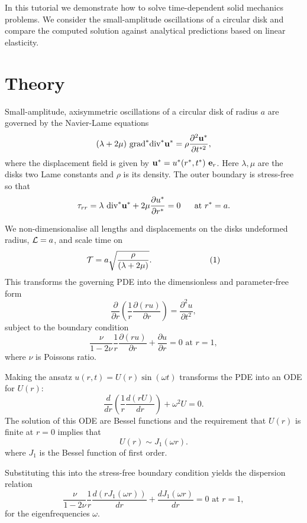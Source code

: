 In this tutorial we demonstrate how to solve time-\/dependent solid mechanics problems. We consider the small-\/amplitude oscillations of a circular disk and compare the computed solution against analytical predictions based on linear elasticity.



 

\hypertarget{index_theory}{}\section{Theory}\label{index_theory}
Small-\/amplitude, axisymmetric oscillations of a circular disk of radius $ a $ are governed by the Navier-\/\+Lame equations \[ (\lambda +2 \mu) \ \mbox{grad}^* \mbox{div}^* {\bf u}^* = \rho \frac{\partial^2 {\bf u}^*}{\partial t^{*2}}, \] where the displacement field is given by $ {\bf u}^* = u^*(r^*,t^*) \ {\bf e}_r$. Here $ \lambda, \mu $ are the disk\textquotesingle{}s two Lame constants and $ \rho $ is its density. The outer boundary is stress-\/free so that \[ \tau_{rr} = \lambda \ \mbox{div}^* {\bf u}^* + 2 \mu \frac{\partial u^*}{\partial r^*} = 0 \ \ \ \ \ \mbox{at } r^* = a. \]

We non-\/dimensionalise all lengths and displacements on the disk\textquotesingle{}s undeformed radius, $ {\cal L} = a $, and scale time on \[ {\cal T} = a \sqrt{\frac{\rho}{(\lambda+2\mu)}}. \ \ \ \ \ \ \ \ \ \ \ \ \ \ \ \ \ \ \ \ \ (1) \] This transforms the governing P\+DE into the dimensionless and parameter-\/free form \[ \frac{\partial}{\partial r}\left(\frac{1}{r} \frac{\partial (ru)}{\partial r}\right) = \frac{\partial^2 u}{\partial t^2}, \] subject to the boundary condition \[ \frac{\nu}{1-2\nu}\frac{1}{r} \frac{\partial (ru)}{\partial r} + \frac{\partial u}{\partial r} = 0 \mbox{\ \ \ \ \ at } r=1, \] where $ \nu $ is Poisson\textquotesingle{}s ratio.

Making the ansatz $ u(r,t) = U(r) \sin(\omega t)$ transforms the P\+DE into an O\+DE for $ U(r) $\+: \[ \frac{d}{dr}\left( \frac{1}{r} \frac{d(rU)}{d r}\right) + \omega^2 U = 0. \] The solution of this O\+DE are Bessel functions and the requirement that $ U(r) $ is finite at $ r=0 $ implies that \[ U(r) \sim J_1(\omega r). \] where $ J_1 $ is the Bessel function of first order.

Substituting this into the stress-\/free boundary condition yields the dispersion relation \[ \frac{\nu}{1-2\nu}\frac{1}{r} \frac{d (rJ_1(\omega r))}{d r} + \frac{dJ_1(\omega r)}{dr} = 0 \mbox{\ \ \ \ \ at } r=1, \] for the eigenfrequencies $ \omega $.

